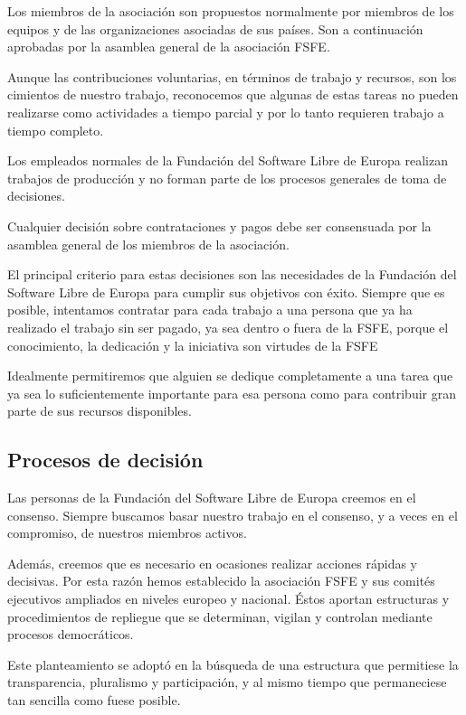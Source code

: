 \documentclass[10pt,foldmark,tumble]{leaflet}
\begin{document}
Los miembros de la asociación son propuestos normalmente por miembros de los equipos y de las organizaciones asociadas de sus países. Son a continuación aprobadas por la asamblea general de la asociación FSFE.

Aunque las contribuciones voluntarias, en términos de trabajo y recursos, son los cimientos de nuestro trabajo, reconocemos que algunas de estas tareas no pueden realizarse como actividades a tiempo parcial y por lo tanto requieren trabajo a tiempo completo.

Los empleados normales de la Fundación del Software Libre de Europa realizan trabajos de producción y no forman parte de los procesos generales de toma de decisiones.

Cualquier decisión sobre contrataciones y pagos debe ser consensuada por la asamblea general de los miembros de la asociación.

El principal criterio para estas decisiones son las necesidades de la Fundación del Software Libre de Europa para cumplir sus objetivos con éxito. Siempre que es posible, intentamos contratar para cada trabajo a una persona que ya ha realizado el trabajo sin ser pagado, ya sea dentro o fuera de la FSFE, porque el conocimiento, la dedicación y la iniciativa son virtudes de la FSFE

Idealmente permitiremos que alguien se dedique completamente a una tarea que ya sea lo suficientemente importante para esa persona como para contribuir gran parte de sus recursos disponibles.

  \subsection{Procesos de decisión}

Las personas de la Fundación del Software Libre de Europa creemos en el consenso. Siempre buscamos basar nuestro trabajo en el consenso, y a veces en el compromiso, de nuestros miembros activos.

Además, creemos que es necesario en ocasiones realizar acciones rápidas y decisivas. Por esta razón hemos establecido la asociación FSFE y sus comités ejecutivos ampliados en niveles europeo y nacional. Éstos aportan estructuras y procedimientos de repliegue que se determinan, vigilan y controlan mediante procesos democráticos.

Este planteamiento se adoptó en la búsqueda de una estructura que permitiese la transparencia, pluralismo y participación, y al mismo tiempo que permaneciese tan sencilla como fuese posible.
\end{document}
